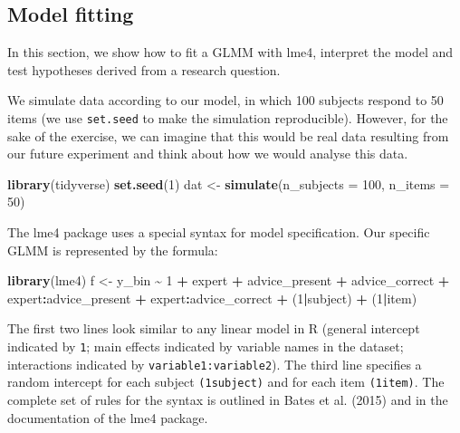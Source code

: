 \documentclass[
  man,floatsintext]{apa6}
\newenvironment{Shaded}{\begin{snugshade}}{\end{snugshade}}
\newcommand{\AttributeTok}[1]{\textcolor[rgb]{0.13,0.29,0.53}{#1}}
\newcommand{\DecValTok}[1]{\textcolor[rgb]{0.00,0.00,0.81}{#1}}
\newcommand{\FunctionTok}[1]{\textcolor[rgb]{0.13,0.29,0.53}{\textbf{#1}}}
\newcommand{\NormalTok}[1]{#1}
\newcommand{\OtherTok}[1]{\textcolor[rgb]{0.56,0.35,0.01}{#1}}
\newcommand{\SpecialCharTok}[1]{\textcolor[rgb]{0.81,0.36,0.00}{\textbf{#1}}}
\begin{document}
\hypertarget{model-fitting}{%
\subsection{Model fitting}\label{model-fitting}}

In this section, we show how to fit a GLMM with lme4, interpret the model and test hypotheses derived from a research question.

We simulate data according to our model, in which 100 subjects respond to 50 items (we use \texttt{set.seed} to make the simulation reproducible). However, for the sake of the exercise, we can imagine that this would be real data resulting from our future experiment and think about how we would analyse this data.

\begin{Shaded}
\begin{Highlighting}[]
\FunctionTok{library}\NormalTok{(tidyverse)}
\FunctionTok{set.seed}\NormalTok{(}\DecValTok{1}\NormalTok{)}
\NormalTok{dat }\OtherTok{\textless{}{-}} \FunctionTok{simulate}\NormalTok{(}\AttributeTok{n\_subjects =} \DecValTok{100}\NormalTok{, }\AttributeTok{n\_items =} \DecValTok{50}\NormalTok{)}
\end{Highlighting}
\end{Shaded}

The lme4 package uses a special syntax for model specification. Our specific GLMM is represented by the formula:

\begin{Shaded}
\begin{Highlighting}[]
\FunctionTok{library}\NormalTok{(lme4)}
\NormalTok{f }\OtherTok{\textless{}{-}}\NormalTok{ y\_bin }\SpecialCharTok{\textasciitilde{}} \DecValTok{1} \SpecialCharTok{+}\NormalTok{ expert }\SpecialCharTok{+}\NormalTok{ advice\_present }\SpecialCharTok{+}\NormalTok{ advice\_correct }\SpecialCharTok{+} 
\NormalTok{  expert}\SpecialCharTok{:}\NormalTok{advice\_present }\SpecialCharTok{+}\NormalTok{ expert}\SpecialCharTok{:}\NormalTok{advice\_correct }\SpecialCharTok{+}
\NormalTok{  (}\DecValTok{1}\SpecialCharTok{|}\NormalTok{subject) }\SpecialCharTok{+}\NormalTok{ (}\DecValTok{1}\SpecialCharTok{|}\NormalTok{item)}
\end{Highlighting}
\end{Shaded}

The first two lines look similar to any linear model in R (general intercept indicated by \texttt{1}; main effects indicated by variable names in the dataset; interactions indicated by \texttt{variable1:variable2}). The third line specifies a random intercept for each subject \texttt{(1\textbar{}subject)} and for each item \texttt{(1\textbar{}item)}. The complete set of rules for the syntax is outlined in Bates et al. (2015) and in the documentation of the lme4 package.
\end{document}
